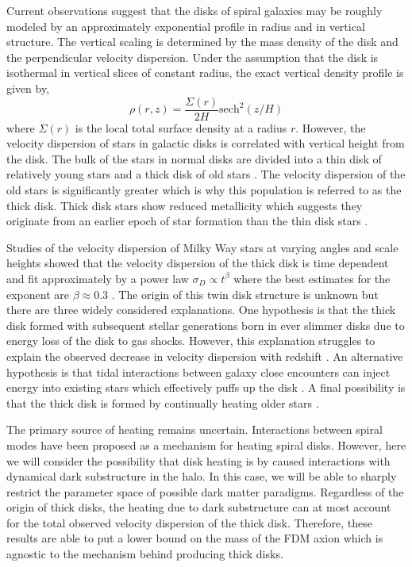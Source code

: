 \documentclass[usenatbib]{mnras}
\begin{document}
\hspace{5mm} Current observations suggest that the disks of spiral galaxies may be roughly modeled by an approximately exponential profile in radius and in vertical structure. The vertical scaling is determined by the mass density of the disk and the perpendicular velocity dispersion. Under the assumption that the disk is isothermal in vertical slices of constant radius, the exact vertical density profile is given by,
\begin{equation}
\rho(r, z) =  \frac{\Sigma(r)}{2H} \mathrm{sech}^2{(z/H)} 
\end{equation} 
where $\Sigma(r)$ is the local total surface density at a radius $r$.
However, the velocity dispersion of stars in galactic disks is correlated with vertical height from the disk. The bulk of the stars in normal disks are divided into a thin disk of relatively young stars and a thick disk of old stars \citep{binney_tremaine_2008}.  The velocity dispersion of the old stars is significantly greater which is why this population is referred to as the thick disk. Thick disk stars show reduced metallicity which suggests they originate from an earlier epoch of star formation than the thin disk stars \citep{binney_tremaine_2008}. 
\par
Studies of the velocity dispersion of Milky Way stars at varying angles and scale heights showed that the velocity dispersion of the thick disk is time dependent and fit approximately by a power law $\sigma_D \propto t^{\beta}$ where the best estimates for the exponent are $\beta \approx 0.3$ \citep{heating_history}. The origin of this twin disk structure is unknown but there are three widely considered explanations. One hypothesis is that the thick disk formed with subsequent stellar generations born in ever slimmer disks due to energy loss of the disk to gas shocks. However, this explanation struggles to explain the observed decrease in velocity dispersion with redshift \citep{emergence-thick-disk}. An alternative hypothesis is that tidal interactions between galaxy close encounters can inject energy into existing stars which effectively puffs up the disk \citep{thick-disk-mergers}. A final possibility is that the thick disk is formed by continually heating older stars \citep{thin-and-thick-disk}. 
\par 
The primary source of heating remains uncertain. Interactions between spiral modes have been proposed as a mechanism for heating spiral disks. However, here we will consider the possibility that disk heating is by caused interactions with dynamical dark substructure in the halo. In this case, we will be able to sharply restrict the parameter space of possible dark matter paradigms. Regardless of the origin of thick disks, the heating due to dark substructure can at most account for the total observed velocity dispersion of the thick disk. Therefore, these results are able to put a lower bound on the mass of the FDM axion which is agnostic to the mechanism behind producing thick disks.
\end{document}
